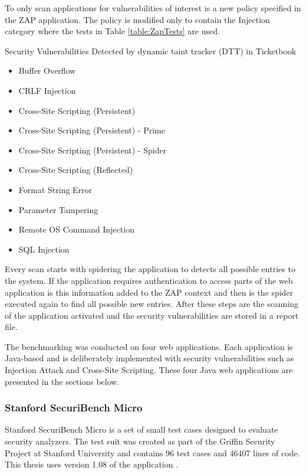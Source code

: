 To only scan applications for vulnerabilities of interest is a new policy specified in the ZAP application. The policy is modified only to contain the Injection category where the tests in Table \ref{table:ZapTests} are used.

\begin{table}[H]
  \centering
  \caption{Security Vulnerabilities Detected by dynamic taint tracker (DTT) in Ticketbook}
    \label{table:ZapTests}
    \begin{itemize}
        \item Buffer Overflow
        \item CRLF Injection
        \item Cross-Site Scripting (Persistent)
        \item Cross-Site Scripting (Persistent) - Prime
        \item Cross-Site Scripting (Persistent) - Spider
        \item Cross-Site Scripting (Reflected)
        \item Format String Error
        \item Parameter Tampering
        \item Remote OS Command Injection
        \item SQL Injection
    \end{itemize}
\end{table}

Every scan starts with spidering the application to detects all possible entries to the system. If the application requires authentication to access parts of the web application is this information added to the ZAP context and then is the spider executed again to find all possible new entries. After these steps are the scanning of the application activated and the security vulnerabilities are stored in a report file. 

The benchmarking was conducted on four web applications. Each application is Java-based and is deliberately implemented with security vulnerabilities such as Injection Attack and Cross-Site Scripting. These four Java web applications are presented in the sections below.



\subsubsection{Stanford SecuriBench Micro}
Stanford SecuriBench Micro is a set of small test cases designed to evaluate security analyzers. The test suit was created as part of the Griffin Security Project \parencite{griffin} at Stanford University and contains 96 test cases and 46407 lines of code. This thesis uses version 1.08 of the application \parencite{securiBenchMicro, microfaq}. 



